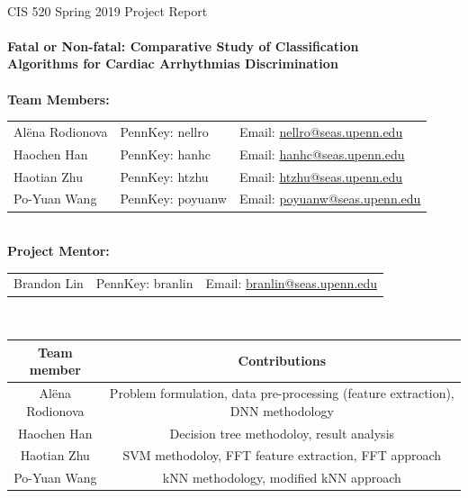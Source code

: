 \renewcommand{\headrulewidth}{0pt}
\renewcommand{\headrulewidth}{0pt}

\thispagestyle{fancy}
\mbox{}\vspace{1cm}\\
CIS 520 Spring 2019 Project Report\\
\\
{\Large \textbf{
Fatal or Non-fatal: Comparative Study of 
Classification \\Algorithms for Cardiac Arrhythmias Discrimination}} 
\\
\vspace{5cm}\\
%
%
%
\textbf{Team Members:}\\
%
\begin{tabular}{lll}%
	Al\"{e}na Rodionova & 
	PennKey: nellro &
	Email: 
	\href{mailto:nellro@seas.upenn.edu}{nellro@seas.upenn.edu} \\
	Haochen Han & 
	PennKey: hanhc& 
	Email: \href{mailto:hanhc@seas.upenn.edu}{hanhc@seas.upenn.edu}\\
	Haotian Zhu &
	PennKey: htzhu& 
	Email: \href{mailto:htzhu@seas.upenn.edu}{htzhu@seas.upenn.edu}\\
	Po-Yuan Wang & 
	PennKey: poyuanw & 
	Email:
	\href{mailto:poyuanw@seas.upenn.edu}{poyuanw@seas.upenn.edu}
\end{tabular}
%
\vspace{1cm}\\
\textbf{Project Mentor:}\\
\begin{tabular}{lll}%
	Brandon Lin & 
	PennKey: branlin &
	Email: 
	\href{mailto:branlin@seas.upenn.edu}{branlin@seas.upenn.edu} \\
\end{tabular}
\vspace{2cm}\\
\begin{table}[h!]
	\begin{center}
	\begin{tabular}{|c|c|}
		\hline
		\textbf{Team member} & \textbf{Contributions} \\ \hline
		Al\"{e}na Rodionova&   Problem formulation, data 
		pre-processing (feature extraction), DNN methodology\\ 
		\hline
		Haochen Han&    Decision tree methodoloy, result analysis \\ \hline
		Haotian Zhu&    SVM methodoloy, FFT feature extraction, FFT approach  \\ \hline
		Po-Yuan Wang&  kNN methodology, modified kNN approach  \\ \hline
	\end{tabular}
\end{center}
\end{table}
\newpage